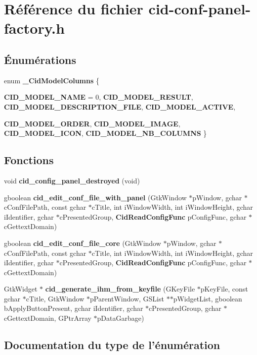 \section{Référence du fichier cid-conf-panel-factory.h}
\label{cid-conf-panel-factory_8h}
\subsection*{Énumérations}
\begin{CompactItemize}
\item 
enum {\bf \_\-CidModelColumns} \{ \par
{\bf CID\_\-MODEL\_\-NAME} =  0, 
{\bf CID\_\-MODEL\_\-RESULT}, 
{\bf CID\_\-MODEL\_\-DESCRIPTION\_\-FILE}, 
{\bf CID\_\-MODEL\_\-ACTIVE}, 
\par
{\bf CID\_\-MODEL\_\-ORDER}, 
{\bf CID\_\-MODEL\_\-IMAGE}, 
{\bf CID\_\-MODEL\_\-ICON}, 
{\bf CID\_\-MODEL\_\-NB\_\-COLUMNS}
 \}
\end{CompactItemize}
\subsection*{Fonctions}
\begin{CompactItemize}
\item 
void {\bf cid\_\-config\_\-panel\_\-destroyed} (void)
\item 
gboolean {\bf cid\_\-edit\_\-conf\_\-file\_\-with\_\-panel} (GtkWindow $\ast$pWindow, gchar $\ast$cConfFilePath, const gchar $\ast$cTitle, int iWindowWidth, int iWindowHeight, gchar iIdentifier, gchar $\ast$cPresentedGroup, {\bf CidReadConfigFunc} pConfigFunc, gchar $\ast$cGettextDomain)
\item 
gboolean {\bf cid\_\-edit\_\-conf\_\-file\_\-core} (GtkWindow $\ast$pWindow, gchar $\ast$cConfFilePath, const gchar $\ast$cTitle, int iWindowWidth, int iWindowHeight, gchar iIdentifier, gchar $\ast$cPresentedGroup, {\bf CidReadConfigFunc} pConfigFunc, gchar $\ast$cGettextDomain)
\item 
GtkWidget $\ast$ {\bf cid\_\-generate\_\-ihm\_\-from\_\-keyfile} (GKeyFile $\ast$pKeyFile, const gchar $\ast$cTitle, GtkWindow $\ast$pParentWindow, GSList $\ast$$\ast$pWidgetList, gboolean bApplyButtonPresent, gchar iIdentifier, gchar $\ast$cPresentedGroup, gchar $\ast$cGettextDomain, GPtrArray $\ast$pDataGarbage)
\end{CompactItemize}


\subsection{Documentation du type de l'énumération}
